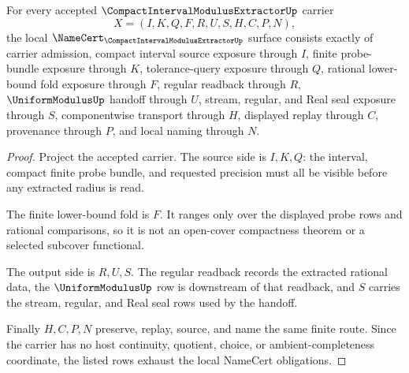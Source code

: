 \begin{theorem}
\label{thm:compact-interval-modulus-extractor-namecert-obligations}
For every accepted $\CompactIntervalModulusExtractorUp$ carrier
$$
X=(I,K,Q,F,R,U,S,H,C,P,N),
$$
the local $\NameCert_{\CompactIntervalModulusExtractorUp}$ surface consists exactly of carrier admission, compact interval source exposure through $I$, finite probe-bundle exposure through $K$, tolerance-query exposure through $Q$, rational lower-bound fold exposure through $F$, regular readback through $R$, $\UniformModulusUp$ handoff through $U$, stream, regular, and Real seal exposure through $S$, componentwise transport through $H$, displayed replay through $C$, provenance through $P$, and local naming through $N$.
\end{theorem}
\begin{proof}
Project the accepted carrier. The source side is $I,K,Q$: the interval, compact finite probe bundle, and requested precision must all be visible before any extracted radius is read.

The finite lower-bound fold is $F$. It ranges only over the displayed probe rows and rational comparisons, so it is not an open-cover compactness theorem or a selected subcover functional.

The output side is $R,U,S$. The regular readback records the extracted rational data, the $\UniformModulusUp$ row is downstream of that readback, and $S$ carries the stream, regular, and Real seal rows used by the handoff.

Finally $H,C,P,N$ preserve, replay, source, and name the same finite route. Since the carrier has no host continuity, quotient, choice, or ambient-completeness coordinate, the listed rows exhaust the local NameCert obligations.
\end{proof}

